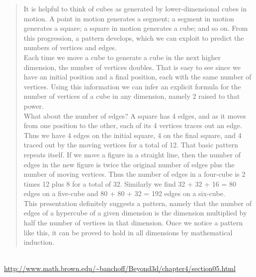 \documentclass[12pt]{article}
\begin{document}
	\begin{quote}		
	It is helpful to think of cubes as generated by lower-dimensional cubes in motion. A point in motion generates a segment; a segment in motion generates a square; a square in motion generates a cube; and so on. From this progression, a pattern develops, which we can exploit to predict the numbers of vertices and edges.\\
	Each time we move a cube to generate a cube in the next higher dimension, the number of vertices doubles. That is easy to see since we have an initial position and a final position, each with the same number of vertices. Using this information we can infer an explicit formula for the number of vertices of a cube in any dimension, namely 2 raised to that power.\\
	What about the number of edges? A square has 4 edges, and as it moves from one position to the other, each of its 4 vertices traces out an edge. Thus we have 4 edges on the initial square, 4 on the final square, and 4 traced out by the moving vertices for a total of 12. That basic pattern repeats itself. If we move a figure in a straight line, then the number of edges in the new figure is twice the original number of edges plus the number of moving vertices. Thus the number of edges in a four-cube is 2 times 12 plus 8 for a total of 32. Similarly we find 32 + 32 + 16 = 80 edges on a five-cube and 80 + 80 + 32 = 192 edges on a six-cube.\\
	This presentation definitely suggests a pattern, namely that the number of edges of a hypercube of a given dimension is the dimension multiplied by half the number of vertices in that dimension. Once we notice a pattern like this, it can be proved to hold in all dimensions by mathematical induction.
	\end{quote}
	\\
	\url{http://www.math.brown.edu/~banchoff/Beyond3d/chapter4/section05.html}
	\\
\end{document}
